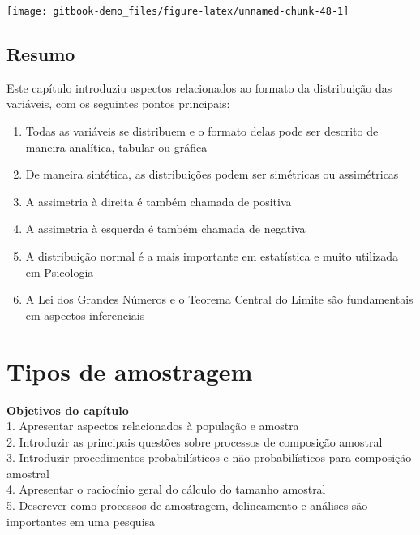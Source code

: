 \documentclass[
]{book}
\providecommand{\tightlist}{%
  \setlength{\itemsep}{0pt}\setlength{\parskip}{0pt}}
\begin{document}
\begin{center}\texttt{[image: gitbook-demo\_files/figure-latex/unnamed-chunk-48-1]} \end{center}

\hypertarget{resumo-3}{%
\section{Resumo}\label{resumo-3}}

\begin{explore}

Este capítulo introduziu aspectos relacionados ao formato da distribuição das variáveis, com os seguintes pontos principais:

\begin{enumerate}
\def\labelenumi{\arabic{enumi}.}
\tightlist
\item
  Todas as variáveis se distribuem e o formato delas pode ser descrito de maneira analítica, tabular ou gráfica\\
\item
  De maneira sintética, as distribuições podem ser simétricas ou assimétricas\\
\item
  A assimetria à direita é também chamada de positiva\\
\item
  A assimetria à esquerda é também chamada de negativa\\
\item
  A distribuição normal é a mais importante em estatística e muito utilizada em Psicologia\\
\item
  A Lei dos Grandes Números e o Teorema Central do Limite são fundamentais em aspectos inferenciais\\
\end{enumerate}

\end{explore}

\hypertarget{tipos-de-amostragem}{%
\chapter{Tipos de amostragem}\label{tipos-de-amostragem}}

\begin{objectives}
\textbf{Objetivos do capítulo}\\
1. Apresentar aspectos relacionados à população e amostra\\
2. Introduzir as principais questões sobre processos de composição
amostral\\
3. Introduzir procedimentos probabilísticos e não-probabilísticos para
composição amostral\\
4. Apresentar o raciocínio geral do cálculo do tamanho amostral\\
5. Descrever como processos de amostragem, delineamento e análises são
importantes em uma pesquisa
\end{objectives}
\end{document}
